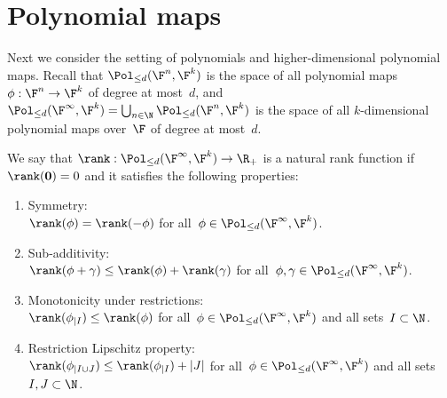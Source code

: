 \section{Polynomial maps}
\label{sec:polynomials}

Next we consider the setting of polynomials and higher-dimensional polynomial maps.
Recall that $\Pol_{\leq d}(\F^n, \F^k)$ is the space of all polynomial maps~$\phi: \F^n \to \F^k$ of degree at most~$d$, and $\Pol_{\leq d}(\F^{\infty}, \F^k) = \bigcup_{n\in \N} \Pol_{\leq d}(\F^n, \F^k)$ is the space of all $k$-dimensional polynomial maps over~$\F$ of degree at most~$d$.

\begin{definition}
We say that $\rank: \Pol_{\leq d}(\F^{\infty}, \F^k) \to \R_+$ is a natural rank function if $\rank({\bf 0}) = 0$ and it satisfies the following properties:
\begin{enumerate}
    \item Symmetry: \\
    $\rank(\phi) = \rank(-\phi)$ for all~$\phi\in \Pol_{\leq d}(\F^{\infty}, \F^k)$.
    \item Sub-additivity: \\
    $\rank(\phi + \gamma) \leq \rank(\phi) + \rank(\gamma)$ for all~$\phi, \gamma\in \Pol_{\leq d}(\F^{\infty}, \F^k)$.
    \item Monotonicity under restrictions: \\
    $\rank(\phi_{|I}) \leq \rank(\phi)$ for all~$\phi\in \Pol_{\leq d}(\F^{\infty}, \F^k)$ and all sets~$I \subset \N$.
    \item Restriction Lipschitz property: \\
    $\rank(\phi_{|I \cup J}) \leq \rank(\phi_{|I}) + |J|$ for all~$\phi\in \Pol_{\leq d}(\F^{\infty}, \F^k)$ and all sets~$I, J \subset \N$.
\end{enumerate}
\end{definition}
